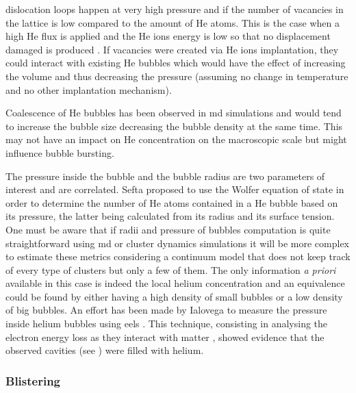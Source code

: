 \Glspl{dislocation loop} happen at very high pressure and if the number of vacancies in the \gls{lattice} is low compared to the amount of He atoms.
This is the case when a high He flux is applied and the He ions energy is low so that no displacement damaged is produced \cite{sefta_surface_2013}.
If vacancies were created via He ions implantation, they could interact with existing He bubbles which would have the effect of increasing the volume and thus decreasing the pressure (assuming no change in temperature and no other implantation mechanism).

Coalescence of He bubbles has been observed in \gls{md} simulations  and would tend to increase the bubble size decreasing the bubble density at the same time.
This may not have an impact on He concentration on the macroscopic scale but might influence bubble bursting.

The pressure inside the bubble and the bubble radius are two parameters of interest and are correlated.
Sefta  proposed to use the Wolfer equation of state in order to determine the number of He atoms contained in a He bubble based on its pressure, the latter being calculated from its radius and its surface tension.
One must be aware that if radii and pressure of bubbles computation is quite straightforward using \gls{md}  or cluster dynamics  simulations it will be more complex to estimate these metrics considering a continuum model that does not keep track of every type of clusters but only a few of them.
The only information \textit{a priori} available in this case is indeed the local helium concentration and an equivalence could be found by either having a high density of small bubbles or a low density of big bubbles.
An effort has been made by Ialovega to measure the pressure inside helium bubbles using \gls{eels} .
This technique, consisting in analysing the electron energy loss as they interact with matter , showed evidence that the observed cavities (see ) were filled with helium.

\subsubsection{Blistering}

